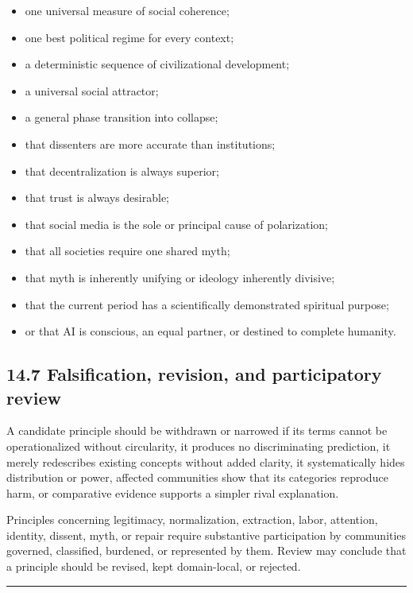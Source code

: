 \documentclass[
  11pt,
]{article}
\providecommand{\tightlist}{%
  \setlength{\itemsep}{0pt}\setlength{\parskip}{0pt}}
\begin{document}
\begin{itemize}
\tightlist
\item
  one universal measure of social coherence;
\item
  one best political regime for every context;
\item
  a deterministic sequence of civilizational development;
\item
  a universal social attractor;
\item
  a general phase transition into collapse;
\item
  that dissenters are more accurate than institutions;
\item
  that decentralization is always superior;
\item
  that trust is always desirable;
\item
  that social media is the sole or principal cause of polarization;
\item
  that all societies require one shared myth;
\item
  that myth is inherently unifying or ideology inherently divisive;
\item
  that the current period has a scientifically demonstrated spiritual
  purpose;
\item
  or that AI is conscious, an equal partner, or destined to complete
  humanity.
\end{itemize}

\subsection{14.7 Falsification, revision, and participatory
review}\label{falsification-revision-and-participatory-review}

A candidate principle should be withdrawn or narrowed if its terms
cannot be operationalized without circularity, it produces no
discriminating prediction, it merely redescribes existing concepts
without added clarity, it systematically hides distribution or power,
affected communities show that its categories reproduce harm, or
comparative evidence supports a simpler rival explanation.

Principles concerning legitimacy, normalization, extraction, labor,
attention, identity, dissent, myth, or repair require substantive
participation by communities governed, classified, burdened, or
represented by them. Review may conclude that a principle should be
revised, kept domain-local, or rejected.

\begin{center}\rule{0.5\linewidth}{0.5pt}\end{center}
\end{document}
